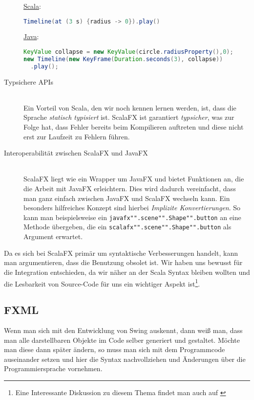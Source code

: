 \begin{description}
\underline{Scala}:
\begin{lstlisting}[language=scala,caption=Scala Beispiel für eine einface Animation,numbers=none]
Timeline(at (3 s) {radius -> 0}).play()
\end{lstlisting}

\underline{Java}:
\begin{lstlisting}[language=Java,caption=Das selbe Beispiel in Java,numbers=none]
KeyValue collapse = new KeyValue(circle.radiusProperty(),0);
new Timeline(new KeyFrame(Duration.seconds(3), collapse))
  .play();
\end{lstlisting}

\item[Typsichere APIs]\hfill\\
Ein Vorteil von Scala, den wir noch kennen lernen werden, ist, dass die Sprache \textit{statisch typisiert} ist. ScalaFX ist garantiert \textit{typsicher}, was zur Folge hat, dass Fehler bereits beim Kompilieren auftreten und diese nicht erst zur Laufzeit zu Fehlern führen. ~\cite{TypesAndProgrammingLanguages}

\item[Interoperabilität zwischen ScalaFX und JavaFX]\hfill\\
ScalaFX liegt wie ein Wrapper um JavaFX und bietet Funktionen an, die die Arbeit mit JavaFX erleichtern. Dies wird dadurch vereinfacht, dass man ganz einfach zwischen JavaFX und ScalaFX wechseln kann. Ein besonders hilfreiches Konzept sind hierbei \textit{Implizite Konvertierungen}. So kann man beispielsweise ein \texttt{javafx"".scene"".Shape"".button} an eine Methode übergeben, die ein \texttt{scalafx"".scene"".Shape"".button} als Argument erwartet.
\end{description}

Da es sich bei ScalaFX primär um syntaktische Verbesserungen handelt, kann man argumentieren, dass die Benutzung obsolet ist. Wir haben uns bewusst für die Integration entschieden, da wir näher an der Scala Syntax bleiben wollten und die Lesbarkeit von Source-Code für uns ein wichtiger Aspekt ist\footnote{Eine Interessante Diskussion zu diesem Thema findet man auch auf \cite{StackoverflowDiscuttionWhyScalaFX}}.


\subsection{FXML}\label{sec:fxml}
Wenn man sich mit den Entwicklung von Swing auskennt, dann weiß man, dass man alle darstellbaren Objekte im Code selber generiert und gestaltet. Möchte man diese dann später ändern, so muss man sich mit dem Programmcode auseinander setzen und hier die Syntax nachvollziehen und Änderungen über die Programmiersprache vornehmen.

